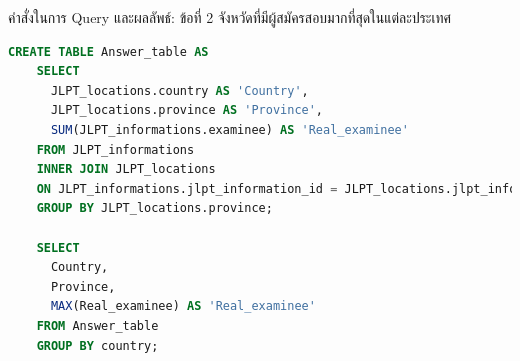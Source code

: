 \documentclass{beamer}
\begin{document}
\begin{frame}[fragile]{คำสั่งในการ Query และผลลัพธ์: ข้อที่ 2}
  จังหวัดที่มีผู้สมัครสอบมากที่สุดในแต่ละประเทศ 
  \begin{tiny}
    \begin{lstlisting}[language=SQL]
    CREATE TABLE Answer_table AS
    SELECT 
      JLPT_locations.country AS 'Country',
      JLPT_locations.province AS 'Province',
      SUM(JLPT_informations.examinee) AS 'Real_examinee'
    FROM JLPT_informations
    INNER JOIN JLPT_locations
    ON JLPT_informations.jlpt_information_id = JLPT_locations.jlpt_information_id
    GROUP BY JLPT_locations.province;

    SELECT 
      Country,
      Province,
      MAX(Real_examinee) AS 'Real_examinee'
    FROM Answer_table
    GROUP BY country;
    \end{lstlisting}
  \end{tiny}
\end{frame}
\end{document}
